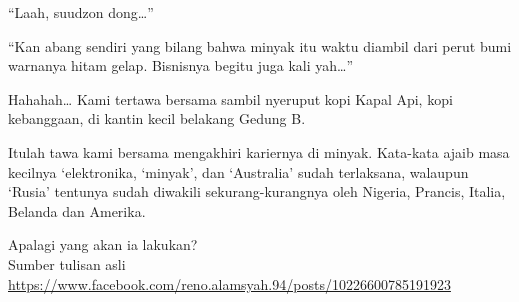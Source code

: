 “Laah, suudzon dong…”

“Kan abang sendiri yang bilang bahwa minyak itu waktu diambil dari perut bumi warnanya hitam gelap. Bisnisnya begitu juga kali yah…”

Hahahah… Kami tertawa bersama sambil nyeruput kopi Kapal Api, kopi kebanggaan, di kantin kecil belakang Gedung B.

Itulah tawa kami bersama mengakhiri kariernya di minyak. Kata-kata ajaib masa kecilnya ‘elektronika, ‘minyak’, dan ‘Australia’ sudah terlaksana, walaupun ‘Rusia’ tentunya sudah diwakili sekurang-kurangnya oleh Nigeria, Prancis, Italia, Belanda dan Amerika.

Apalagi yang akan ia lakukan?
\\[10pt]

Sumber tulisan asli \url{https://www.facebook.com/reno.alamsyah.94/posts/10226600785191923}

